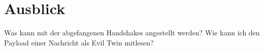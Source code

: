 \documentclass[12pt]{article}
\begin{document}
\section{Ausblick}
Was kann mit der abgefangenen Handshakes angestellt werden? 
Wie kann ich den Payload einer Nachricht als Evil Twin mitlesen? 
\end{document}
